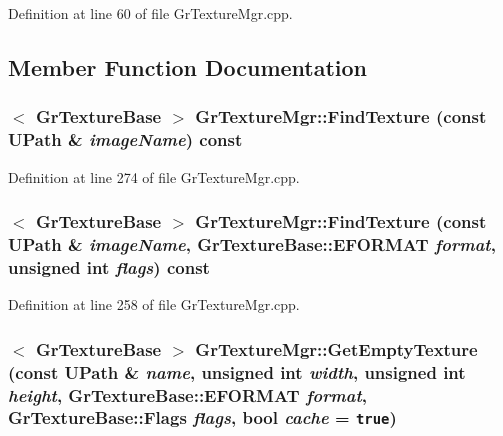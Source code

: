 Definition at line 60 of file GrTextureMgr.cpp.

\subsection{Member Function Documentation}
\hypertarget{class_gr_texture_mgr_a70c68e3de9b73044851ffebb35d4cba}{
\subsubsection[{FindTexture}]{$<$ {\bf GrTextureBase} $>$ GrTextureMgr::FindTexture (const {\bf UPath} \& {\em imageName}) const}}
\label{class_gr_texture_mgr_a70c68e3de9b73044851ffebb35d4cba}




Definition at line 274 of file GrTextureMgr.cpp.\hypertarget{class_gr_texture_mgr_83321c109ae9862b3e9ad6acabd8819d}{
\subsubsection[{FindTexture}]{$<$ {\bf GrTextureBase} $>$ GrTextureMgr::FindTexture (const {\bf UPath} \& {\em imageName}, \/  {\bf GrTextureBase::EFORMAT} {\em format}, \/  unsigned int {\em flags}) const}}
\label{class_gr_texture_mgr_83321c109ae9862b3e9ad6acabd8819d}




Definition at line 258 of file GrTextureMgr.cpp.\hypertarget{class_gr_texture_mgr_8cc9e107fe42053e462f63db1f48422c}{
\subsubsection[{GetEmptyTexture}]{$<$ {\bf GrTextureBase} $>$ GrTextureMgr::GetEmptyTexture (const {\bf UPath} \& {\em name}, \/  unsigned int {\em width}, \/  unsigned int {\em height}, \/  {\bf GrTextureBase::EFORMAT} {\em format}, \/  {\bf GrTextureBase::Flags} {\em flags}, \/  bool {\em cache} = {\tt true})}}
\label{class_gr_texture_mgr_8cc9e107fe42053e462f63db1f48422c}




